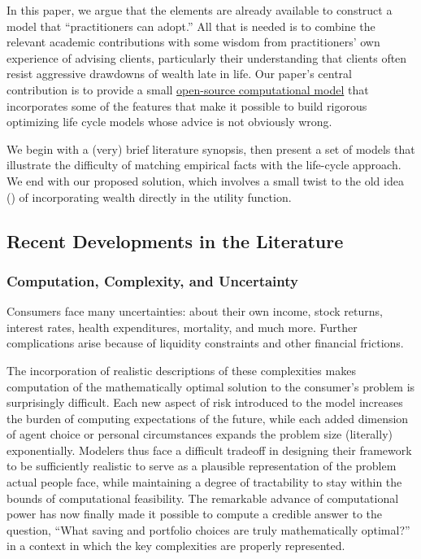 \documentclass{article}
\begin{document}
In this paper, we argue that the elements are already available to construct a model that ``practitioners can adopt.''
All that is needed is to combine the relevant academic contributions with some wisdom from practitioners' own experience of advising clients, particularly their understanding that clients often resist aggressive drawdowns of wealth late in life.
Our paper's central contribution is to provide a small \href{https://github.com/econ-ark/life-cycle-prime-time}{open-source computational model} that incorporates some of the features that make it possible to build rigorous optimizing life cycle models whose advice is not obviously wrong.

We begin with a (very) brief literature synopsis, then present a set of models that illustrate the difficulty of matching empirical facts with the life-cycle approach.
We end with our proposed solution, which involves a small twist to the old idea (\cite{carrollWhyDoTheRich}) of incorporating wealth directly in the utility function.

\subsection{Recent Developments in the Literature}

\subsubsection{Computation, Complexity, and Uncertainty}

Consumers face many uncertainties: about their own income, stock returns, interest rates, health expenditures, mortality, and much more.
Further complications arise because of liquidity constraints and other financial frictions.

The incorporation of realistic descriptions of these complexities makes computation of the mathematically optimal solution to the consumer's problem is surprisingly difficult.
Each new aspect of risk introduced to the model increases the burden of computing expectations of the future, while each added dimension of agent choice or personal circumstances expands the problem size (literally) exponentially.
Modelers thus face a difficult tradeoff in designing their framework to be sufficiently realistic to serve as a plausible representation of the problem actual people face, while maintaining a degree of tractability to stay within the bounds of computational feasibility.
The remarkable advance of computational power has now finally made it possible to compute a credible answer to the question, ``What saving and portfolio choices are truly mathematically optimal?'' in a context in which the key complexities are properly represented.
\end{document}
